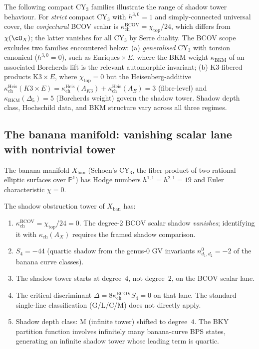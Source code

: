 The following compact CY$_3$ families illustrate the range of shadow tower behaviour. For \emph{strict} compact CY$_3$ with $h^{3,0} = 1$ and simply-connected universal cover, the \emph{conjectural} BCOV scalar is $\kappa_{\mathrm{ch}}^{\mathrm{BCOV}} = \chi_{\mathrm{top}} / 24$, which differs from $\chi(\cO_X)$; the latter vanishes for all CY$_3$ by Serre duality. The BCOV scope excludes two families encountered below: (a) \emph{generalised} CY$_3$ with torsion canonical ($h^{3,0} = 0$), such as Enriques\,$\times\,E$, where the BKM weight $\kappa_{\mathrm{BKM}}$ of an associated Borcherds lift is the relevant automorphic invariant; (b) K$3$-fibered products K$3 \times E$, where $\chi_{\mathrm{top}} = 0$ but the Heisenberg-additive $\kappa_{\mathrm{ch}}^{\mathrm{Heis}}(K3 \times E) = \kappa_{\mathrm{ch}}^{\mathrm{Heis}}(A_{K3}) + \kappa_{\mathrm{ch}}^{\mathrm{Heis}}(A_E) = 3$ (fibre-level) and $\kappa_{\mathrm{BKM}}(\Delta_5) = 5$ (Borcherds weight) govern the shadow tower. Shadow depth class, Hochschild data, and BKM structure vary across all three regimes.



\subsection{The banana manifold: vanishing scalar lane with nontrivial tower}
\label{subsec:banana-manifold}

The banana manifold $X_{\mathrm{ban}}$ (Schoen's CY$_3$, the fiber product of two rational elliptic surfaces over $\mathbb{P}^1$) has Hodge numbers $h^{1,1} = h^{2,1} = 19$ and Euler characteristic $\chi = 0$.

\begin{proposition}
\label{prop:banana-shadow}
The shadow obstruction tower of $X_{\mathrm{ban}}$ has:
\begin{enumerate}[label=(\roman*)]
 \item \(\kappa_{\mathrm{ch}}^{\mathrm{BCOV}}=\chi_{\mathrm{top}}/24=0\). The degree-$2$ BCOV scalar shadow \emph{vanishes}; identifying it with \(\kappa_{\mathrm{ch}}(A_X)\) requires the framed shadow comparison.
 \item $S_4 = -44$ (quartic shadow from the genus-$0$ GV invariants $n^0_{d_1, d_2} = -2$ of the banana curve classes).
 \item The shadow tower starts at degree~$4$, not degree~$2$, on the BCOV scalar lane.
 \item The critical discriminant $\Delta = 8 \kappa_{\mathrm{ch}}^{\mathrm{BCOV}} S_4 = 0$ on that lane. The standard single-line classification (G/L/C/M) does not directly apply.
 \item Shadow depth class: M (infinite tower) shifted to degree~$4$. The BKY partition function involves infinitely many banana-curve BPS states, generating an infinite shadow tower whose leading term is quartic.
\end{enumerate}
\end{proposition}

